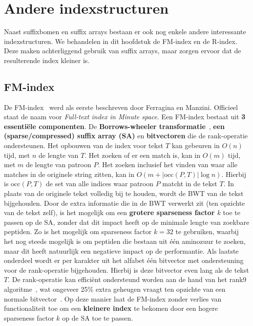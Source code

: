 \chapter{Andere indexstructuren}\label{ch:andere-indices}
Naast suffixbomen en suffix arrays bestaan er ook nog enkele andere interessante indexstructuren.
We behandelen in dit hoofdstuk de FM-index en de R-index.
Deze maken achterliggend gebruik van suffix arrays, maar zorgen ervoor dat de resulterende index kleiner is.


\section{FM-index}\label{sec:fm-index}
De FM-index~\cite{fm_index} werd als eerste beschreven door Ferragina en Manzini.
Officieel staat de naam voor \textit{Full-text index in Minute space}.
Een FM-index bestaat uit \textbf{3 essentiële componenten}.
De \textbf{Borrows-wheeler transformatie}~\cite{bwt}, \textbf{een (sparse/compressed) suffix array (SA)} en \textbf{bitvectoren} die de rank-operatie ondersteunen.
Het opbouwen van de index voor tekst $T$ kan gebeuren in $O(n)$ tijd, met $n$ de lengte van $T$.
Het zoeken of er een match is, kan in $O(m)$ tijd, met $m$ de lengte van patroon $P$.
Het zoeken inclusief het vinden van waar alle matches in de originele string zitten, kan in $O(m + \text{|occ}(P, T)\text{|} \log n)$.
Hierbij is $\text{occ}(P, T)$ de set van alle indices waar patroon $P$ matcht in de tekst $T$.
In plaats van de originele tekst volledig bij te houden, wordt de BWT van de tekst bijgehouden.
Door de extra informatie die in de BWT verwerkt zit (ten opzichte van de tekst zelf), is het mogelijk om een \textbf{grotere sparseness factor $k$} toe te passen op de SA, zonder dat dit impact heeft op de minimale lengte van zoekbare peptiden.
Zo is het mogelijk om sparseness factor $k = 32$ te gebruiken, waarbij het nog steeds mogelijk is om peptiden die bestaan uit één aminozuur te zoeken, maar dit heeft natuurlijk een negatieve impact op de performantie.
Als laatste onderdeel wordt er per karakter uit het alfabet één bitvector met ondersteuning voor de rank-operatie bijgehouden.
Hierbij is deze bitvector even lang als de tekst $T$.
De rank-operatie kan efficiënt ondersteund worden aan de hand van het rank9 algoritme~\cite{rank9}, wat ongeveer 25\% extra geheugen vraagt ten opzichte van een normale bitvector~\cite{CCB_course}.
Op deze manier laat de FM-index zonder verlies van functionaliteit toe om een \textbf{kleinere index} te bekomen door een hogere sparseness factor $k$ op de SA toe te passen.
